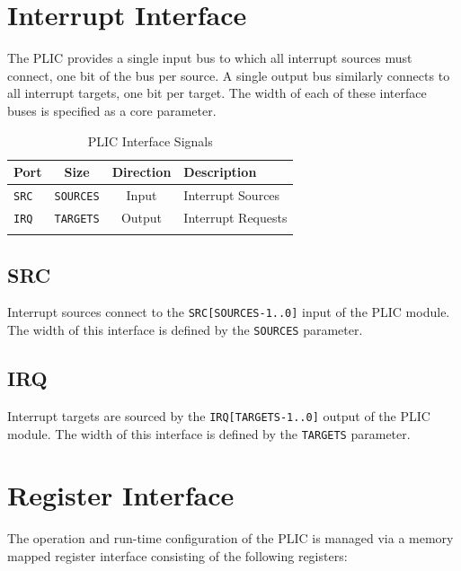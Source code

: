 \section{Interrupt Interface} 

The PLIC provides a single input bus to which all interrupt sources must connect, one bit of the bus per source. A single output bus similarly connects to all interrupt targets, one bit per target. The width of each of these interface buses is specified as a core parameter.
\begin{longtable}[c]{@{\extracolsep{\fill}}lccl@{\extracolsep{\fill}}}	
	\toprule
	\textbf{Port} & \textbf{Size}    & \textbf{Direction} & \textbf{Description}\\
	\midrule 
	\endhead
	\texttt{SRC}  & \texttt{SOURCES} & Input  & Interrupt Sources\\
	\texttt{IRQ}  & \texttt{TARGETS} & Output & Interrupt Requests \\
	\bottomrule 	
	\caption{PLIC Interface Signals} 
	\label{tab:PLICIF2}
\end{longtable}

\subsection{SRC}

Interrupt sources connect to the \texttt{SRC{[}SOURCES-1..0{]}} input of
the PLIC module. The width of this interface is defined by the \texttt{SOURCES} parameter. 

\subsection{IRQ}

Interrupt targets are sourced by the \texttt{IRQ{[}TARGETS-1..0{]}}
output of the PLIC module. The width of this interface is defined by the
\texttt{TARGETS} parameter.

\section{Register Interface}

The operation and run-time configuration of the PLIC is managed via a memory mapped register interface consisting of the following registers:

